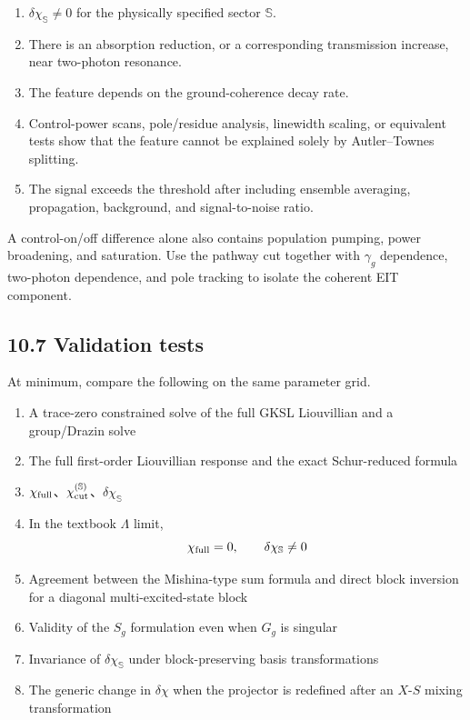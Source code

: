 \documentclass[
  10pt,
  a4paper,
]{article}
\providecommand{\tightlist}{%
  \setlength{\itemsep}{0pt}\setlength{\parskip}{0pt}}
\begin{document}
\begin{enumerate}
\def\labelenumi{\arabic{enumi}.}
\tightlist
\item
  \(\delta\chi_{\mathbb S}\neq0\) for the physically specified sector
  \(\mathbb S\).
\item
  There is an absorption reduction, or a corresponding transmission
  increase, near two-photon resonance.
\item
  The feature depends on the ground-coherence decay rate.
\item
  Control-power scans, pole/residue analysis, linewidth scaling, or
  equivalent tests show that the feature cannot be explained solely by
  Autler--Townes splitting.
\item
  The signal exceeds the threshold after including ensemble averaging,
  propagation, background, and signal-to-noise ratio.
\end{enumerate}

A control-on/off difference alone also contains population pumping,
power broadening, and saturation. Use the pathway cut together with
\(\gamma_g\) dependence, two-photon dependence, and pole tracking to
isolate the coherent EIT component.

\subsection{10.7 Validation tests}\label{validation-tests}

At minimum, compare the following on the same parameter grid.

\begin{enumerate}
\def\labelenumi{\arabic{enumi}.}
\tightlist
\item
  A trace-zero constrained solve of the full GKSL Liouvillian and a
  group/Drazin solve
\item
  The full first-order Liouvillian response and the exact Schur-reduced
  formula
\item
  \(\chi_{\rm full}\)、\(\chi_{\rm cut}^{(\mathbb S)}\)、\(\delta\chi_{\mathbb S}\)
\item
  In the textbook \(\Lambda\) limit, \[
  \chi_{\rm full}=0,
  \qquad
  \delta\chi_{\mathbb S}\neq0
  \]
\item
  Agreement between the Mishina-type sum formula and direct block
  inversion for a diagonal multi-excited-state block
\item
  Validity of the \(S_g\) formulation even when \(G_g\) is singular
\item
  Invariance of \(\delta\chi_{\mathbb S}\) under block-preserving basis
  transformations
\item
  The generic change in \(\delta\chi\) when the projector is redefined
  after an \(X\)-\(S\) mixing transformation
\end{enumerate}
\end{document}
